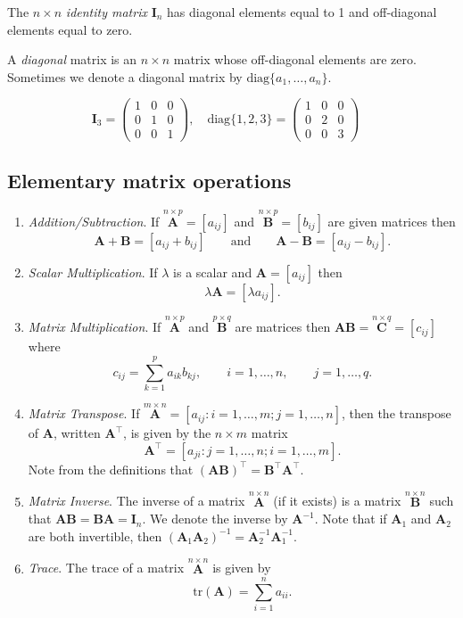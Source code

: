\documentclass[]{book}
\theoremstyle{definition}
\theoremstyle{definition}
\theoremstyle{definition}
\theoremstyle{remark}
\begin{document}
The \(n\times n\) \emph{identity matrix} \({\mathbf I}_n\) has diagonal elements equal to 1
and off-diagonal elements equal to zero.

A \emph{diagonal} matrix is an \(n \times n\) matrix whose
off-diagonal elements are zero. Sometimes we denote a diagonal
matrix by \(\text{diag}\{a_1,\ldots, a_n\}\).

\[\mathbf I_3 = \left(\begin{array}{ccc} 1&0&0\\ 0&1&0\\ 0&0&1\end{array}\right),\quad \text{diag}\{1,2,3\}=\left(\begin{array}{ccc} 1&0&0\\ 0&2&0\\ 0&0&3\end{array}\right)\quad\]

\hypertarget{elementary-matrix-operations}{%
\subsection{Elementary matrix operations}\label{elementary-matrix-operations}}

\begin{enumerate}
\def\labelenumi{\arabic{enumi}.}
\item
  \emph{Addition/Subtraction}. If \(\stackrel{n\times p}{\mathbf A}=[a_{ij}]\) and \(\stackrel{n\times p}{\mathbf B}=[b_{ij}]\) are
  given matrices then
  \[ {\mathbf A}+{\mathbf B}=[a_{ij}+b_{ij}] \qquad \text{and} \qquad {\mathbf A}-{\mathbf B}=[a_{ij}-b_{ij}].\]
\item
  \emph{Scalar Multiplication}. If \(\lambda\) is a scalar and \({\mathbf A}=[a_{ij}]\) then
  \[\lambda {\mathbf A}=[\lambda a_{ij}].\]
\item
  \emph{Matrix Multiplication}. If \(\stackrel{n\times p}{\mathbf A}\) and \(\stackrel{p\times q}{\mathbf B}\) are
  matrices then \(\boldsymbol A\boldsymbol B=\stackrel{n\times q}{\mathbf C}=[c_{ij}]\) where
  \[c_{ij}=\sum _{k=1}^p a_{ik}b_{kj}, \qquad i=1,\dots,n, \qquad j=1,\dots ,q.\]
\item
  \emph{Matrix Transpose}. If \(\stackrel{m \times n}{\boldsymbol A}=[a_{ij}: i=1, \ldots , m; j=1, \ldots , n]\), then the transpose of \(\boldsymbol A\), written
  \(\boldsymbol A^\top\), is given by the \(n \times m\) matrix
  \[
  \boldsymbol A^\top =[a_{ji}: j=1, \ldots , n; i=1, \ldots, m].
  \]
  Note from the definitions that \((\boldsymbol A\boldsymbol B)^\top={\mathbf B}^\top {\mathbf A}^\top\).
\item
  \emph{Matrix Inverse}. The inverse of a matrix \(\stackrel{n\times n}{\mathbf A}\) (if it exists) is a
  matrix \(\stackrel{n\times n}{\mathbf B}\) such that \({\mathbf A}\boldsymbol B=\boldsymbol B\boldsymbol A={\mathbf I}_n.\) We denote
  the inverse by \({\mathbf A}^{-1}\). Note that if \({\mathbf A}_1\) and \({\mathbf A}_2\) are both invertible,
  then \(({\mathbf A}_1 {\mathbf A}_2)^{-1}={\mathbf A}_2^{-1}{\mathbf A}_1^{-1}\).
\item
  \emph{Trace}. The trace of a matrix \(\stackrel{n\times n}{\mathbf A}\) is given by
  \[ \text{tr}({\mathbf A})=\sum _{i=1}^n a_{ii}.\]
\end{enumerate}
\end{document}
